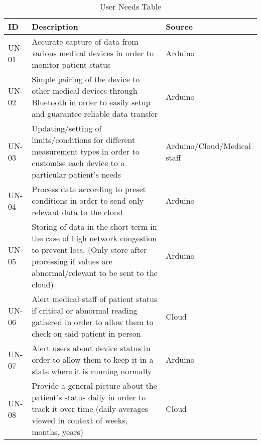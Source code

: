 \begin{landscape}
\thispagestyle{empty}
\begin{table}[H]
\centering
\caption{User Needs Table}
\begin{tabularx}{\linewidth}{|p{2.5cm}|X|p{2cm}|}
\hline 
\textbf{ID} & \textbf{Description } & \textbf{Source} \\
\hline
UN-01 & Accurate capture of data from various medical devices in order to monitor patient status & Arduino \\
\hline
UN-02 & Simple pairing of the device to other medical devices through Bluetooth in order to easily setup and guarantee reliable data transfer & Arduino \\
\hline
UN-03 & Updating/setting of limits/conditions for different measurement types in order to customise each device to a particular patient's needs & Arduino/\newline Cloud/\newline Medical staff \\
\hline
UN-04 & Process data according to preset conditions in order to send only relevant data to the cloud & Arduino \\
\hline
UN-05 & Storing of data in the short-term in the case of high network congestion to prevent loss. (Only store after processing if values are abnormal/relevant to be sent to the cloud) & Arduino \\
\hline
UN-06 & Alert medical staff of patient status if critical or abnormal reading gathered in order to allow them to check on said patient in person & Cloud \\
\hline
UN-07 & Alert users about device status in order to allow them to keep it in a state where it is running normally & Arduino \\
\hline
UN-08 & Provide a general picture about the patient's status daily in order to track it over time (daily averages viewed in context of weeks, months, years) & Cloud \\
\hline
\end{tabularx}
\label{tab:user_needs_table}
\end{table}
\end{landscape}
